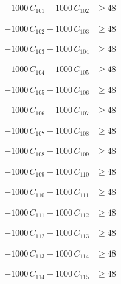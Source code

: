 \documentclass[a4paper,11pt]{article}
\begin{document}
\begin{align}
-1000\,C_{101} + 1000\,C_{102} &\geq 48 \nonumber
\end{align}

\begin{align}
-1000\,C_{102} + 1000\,C_{103} &\geq 48 \nonumber
\end{align}

\begin{align}
-1000\,C_{103} + 1000\,C_{104} &\geq 48 \nonumber
\end{align}

\begin{align}
-1000\,C_{104} + 1000\,C_{105} &\geq 48 \nonumber
\end{align}

\begin{align}
-1000\,C_{105} + 1000\,C_{106} &\geq 48 \nonumber
\end{align}

\begin{align}
-1000\,C_{106} + 1000\,C_{107} &\geq 48 \nonumber
\end{align}

\begin{align}
-1000\,C_{107} + 1000\,C_{108} &\geq 48 \nonumber
\end{align}

\begin{align}
-1000\,C_{108} + 1000\,C_{109} &\geq 48 \nonumber
\end{align}

\begin{align}
-1000\,C_{109} + 1000\,C_{110} &\geq 48 \nonumber
\end{align}

\begin{align}
-1000\,C_{110} + 1000\,C_{111} &\geq 48 \nonumber
\end{align}

\begin{align}
-1000\,C_{111} + 1000\,C_{112} &\geq 48 \nonumber
\end{align}

\begin{align}
-1000\,C_{112} + 1000\,C_{113} &\geq 48 \nonumber
\end{align}

\begin{align}
-1000\,C_{113} + 1000\,C_{114} &\geq 48 \nonumber
\end{align}

\begin{align}
-1000\,C_{114} + 1000\,C_{115} &\geq 48 \nonumber
\end{align}
\end{document}
